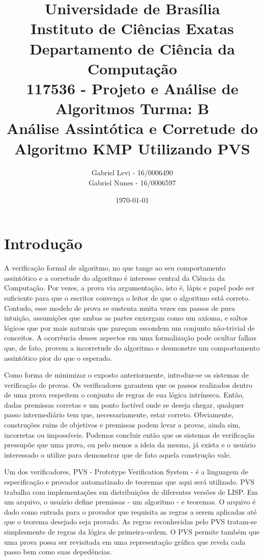 \documentclass[12pt]{article}
\title{{\large Universidade de Brasília \\ Instituto de Ciências Exatas \\
Departamento de Ciência da Computação} \\[1cm]
117536 - Projeto e Análise de Algoritmos Turma: B\\[.5cm]
Análise Assintótica e Corretude do Algoritmo KMP Utilizando PVS}
\author{Gabriel Levi - 16/0006490 \\
        Gabriel Nunes - 16/0006597}
\date{\today}
\begin{document}
\maketitle
\newpage

\section{Introdução}
\noindent A verificação formal de algoritmo, no que tange ao seu comportamento assintótico e a corretude do algoritmo é interesse
central da Ciência da Computação. Por vezes, a prova via argumentação, isto é, lápis e papel pode ser suficiente para que o escritor
convença o leitor de que o algoritmo está correto. Contudo, esse modelo de prova se sustenta muita vezes em passos de pura intuição,
assumições que ambas as partes enxergam como um axioma, e saltos lógicos que por mais naturais que pareçam escondem um conjunto não-trivial
de conceitos. A ocorrência desses aspectos em uma formalização pode ocultar falhas que, de fato, provem a incorretude do algoritmo e desmonstre
um comportamento assintótico pior do que o esperado.

Como forma de minimizar o exposto anteriormente, introduz-se os sistemas de verificação de provas. Os verificadores garantem que os passos realizados
dentro de uma prova respeitem o conjunto de regras de sua lógica intrínseca. Então, dadas premissas corretas e um ponto factível onde se deseja chegar, qualquer
passo intermediário tem que, necessariamente, estar correto. Obviamente, construções ruins de objetivos e premissas podem levar a provas, ainda sim, incorretas
ou impossíveis. Podemos concluir então que os sistemas de verificação pressupõe que uma prova, ou pelo menos a ideia da mesma, já exista e o usuário interessado
o utilize para demonstrar que de fato aquela construção vale.

Um dos verificadores, PVS - Prototype Verification System - é a linguagem de especificação e provador automatizado de teoremas que aqui será utilizado.
PVS trabalha com implementações em distribuições de diferentes versões de LISP. Em um arquivo, o usuário define premissas - um algoritmo - e teoremas.
O arquivo é dado como entrada para o provador que requisita as regras a serem aplicadas até que o teorema desejado seja provado. As regras reconhecidas pelo
PVS tratam-se simplesmente de regras da lógica de primeira-ordem. O PVS permite também que uma prova possa ser revisitada em uma representação gráfica que
revela cada passo bem como suas depedências.
\end{document}

